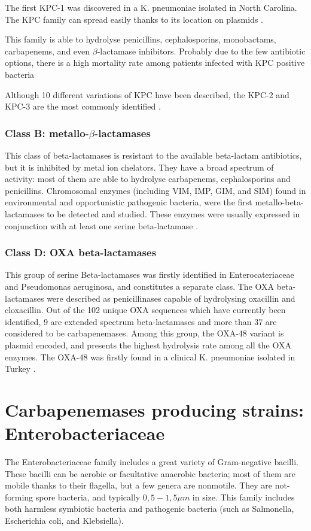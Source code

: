 \documentclass[11pt]{report}
\begin{document}
The first KPC-1 was discovered in a K. pneumoniae isolated in North Carolina.
The KPC family can spread easily thanks to its location on plasmids \cite{Queenan2007}.

This family is able to hydrolyse penicillins, cephalosporins, monobactams, carbapenems, and even $\beta$-lactamase inhibitors.
Probably due to the few antibiotic options, there is a high mortality rate among patients infected with KPC positive bacteria \cite{MunozPrice2013}

Although 10 different variations of KPC have been described, the KPC-2 and KPC-3 are the most commonly identified \cite{WaltherRasmussen2007}.

\subsection {Class B: metallo-$\beta$-lactamases}
This class of beta-lactamases is resistant to the available beta-lactam antibiotics, but it is inhibited by metal ion chelators.
They have a broad spectrum of activity: most of them are able to hydrolyse carbapenems, cephalosporins and penicillins.
Chromosomal enzymes (including VIM, IMP, GIM, and SIM) found in environmental and opportunistic pathogenic bacteria, were the first metallo-beta-lactamases to be detected and studied.
These enzymes were usually expressed in conjunction with at least one serine beta-lactamase \cite{Queenan2007}.

\subsection{Class D: OXA beta-lactamases}
This group of serine Beta-lactamases was firstly identified in Enterocateriaceae and Pseudomonas aeruginosa, and constitutes a separate class.
The OXA beta-lactamases were described as penicillinases capable of hydrolysing oxacillin and cloxacillin.
Out of the 102 unique OXA sequences which have currently been identified, 9 are extended spectrum beta-lactamases and more than 37 are considered to be carbapenemases.
Among this group, the OXA-48 variant is plasmid encoded, and presents the highest hydrolysis rate among all the OXA enzymes.
The OXA-48 was firstly found in a clinical K. pneumoniae isolated in Turkey \cite{Poirel2012}.

\chapter{Carbapenemases producing strains: Enterobacteriaceae}
The Enterobacteriaceae family includes a great variety of Gram-negative bacilli.
These bacilli can be aerobic or facultative anaerobic bacteria; most of them are mobile thanks to their flagella, but a few genera are nonmotile.
They are not-forming spore bacteria, and typically $0,5-1,5\mu m$ in size.
This family includes both harmless symbiotic bacteria and pathogenic bacteria (such as Salmonella, Escherichia coli, and Klebsiella).
\end{document}
